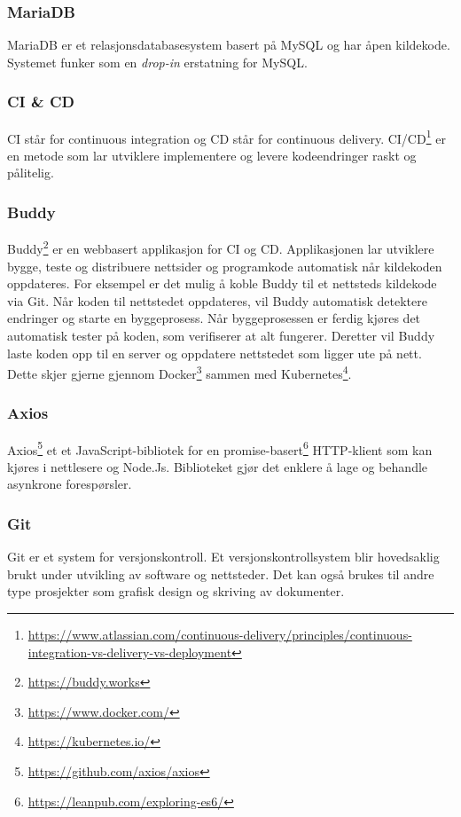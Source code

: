 \subsubsection{MariaDB}
MariaDB \cite{mariadb2019amd} er et relasjonsdatabasesystem basert på MySQL og har åpen kildekode. Systemet funker som en \textit{drop-in} erstatning for MySQL.

\subsubsection{CI \& CD}
CI står for continuous integration og CD står for continuous delivery. CI/CD\footnote{\url{https://www.atlassian.com/continuous-delivery/principles/continuous-integration-vs-delivery-vs-deployment}} er en metode som lar utviklere implementere og levere kodeendringer raskt og pålitelig.

\subsubsection{Buddy}
Buddy\footnote{\url{https://buddy.works}} er en webbasert applikasjon for CI og CD. Applikasjonen lar utviklere bygge, teste og distribuere nettsider og programkode automatisk når kildekoden oppdateres. For eksempel er det mulig å koble Buddy til et nettsteds kildekode via Git. Når koden til nettstedet oppdateres, vil Buddy automatisk detektere endringer og starte en byggeprosess. Når byggeprosessen er ferdig kjøres det automatisk tester på koden, som verifiserer at alt fungerer. Deretter vil Buddy laste koden opp til en server og oppdatere nettstedet som ligger ute på nett. Dette skjer gjerne gjennom Docker\footnote{\url{https://www.docker.com/}} sammen med Kubernetes\footnote{\url{https://kubernetes.io/}}.

\subsubsection{Axios}
Axios\footnote{\url{https://github.com/axios/axios}} et et JavaScript-bibliotek for en promise-basert\footnote{\url{https://leanpub.com/exploring-es6/}} HTTP-klient som kan kjøres i nettlesere og Node.Js. Biblioteket gjør det enklere å lage og behandle asynkrone forespørsler.

\subsubsection{Git}
Git er et system for versjonskontroll. Et versjonskontrollsystem blir hovedsaklig brukt under utvikling av software og nettsteder. Det kan også brukes til andre type prosjekter som grafisk design og skriving av dokumenter.


